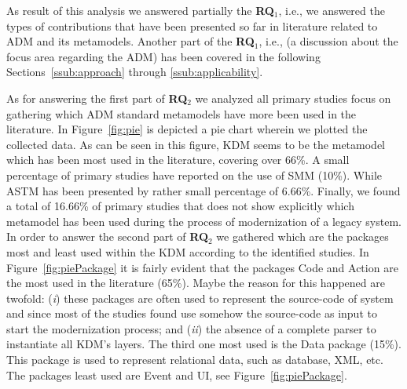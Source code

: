 

 As result of this analysis we answered partially the \textbf{RQ$_1$}, i.e., we answered the types of contributions that have been presented so far in literature related to ADM and its metamodels. Another part of the \textbf{RQ$_1$}, i.e., (a discussion about the focus area regarding the ADM) has been covered in the following Sections~\ref{ssub:approach} through \ref{ssub:applicability}. %

As for answering the first part of \textbf{RQ$_2$} we analyzed all primary studies focus on gathering which ADM standard metamodels have more been used in the literature. In Figure~\ref{fig:pie} is depicted a pie chart wherein we plotted the collected data. As can be seen in this figure, KDM seems to be the metamodel which has been most used in the literature, covering over 66\%. A small percentage of primary studies have reported on the use of SMM (10\%). While ASTM has been presented by rather small percentage of 6.66\%. Finally, we found a total of 16.66\% of primary studies that does not show explicitly which metamodel has been used during the process of modernization of a legacy system. In order to answer the second part of \textbf{RQ$_2$} we gathered which are the packages most and least used within the KDM according to the identified studies. In Figure~\ref{fig:piePackage} it is fairly evident that the packages Code and Action are the most used in the literature (65\%). Maybe the reason for this happened are twofold: (\textit{i}) these packages are often used to represent the source-code of system and since most of the studies found use somehow the source-code as input to start the modernization process; and (\textit{ii}) the absence of a complete parser to instantiate all KDM's layers. The third one most used is the Data package (15\%). This package is used to represent relational data, such as database, XML, etc. The packages least used are Event and UI, see Figure~\ref{fig:piePackage}. 

